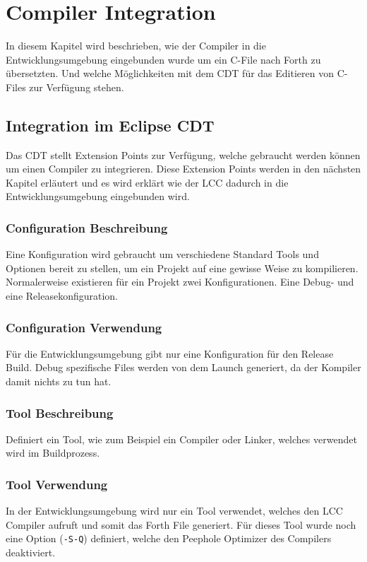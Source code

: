\chapter{Compiler Integration}
\label{chap:compilerintegration}

In diesem Kapitel wird beschrieben, wie der Compiler in die Entwicklungsumgebung eingebunden wurde um ein C-File nach Forth zu übersetzten. Und welche Möglichkeiten mit dem CDT für das Editieren von C-Files zur Verfügung stehen.

\section{Integration im Eclipse CDT}

Das CDT stellt Extension Points zur Verfügung, welche gebraucht werden können um einen Compiler zu integrieren. Diese Extension Points werden in den nächsten Kapitel erläutert und es wird erklärt wie der LCC dadurch in die Entwicklungsumgebung eingebunden wird.

\subsection{Configuration Beschreibung}
Eine Konfiguration wird gebraucht um verschiedene Standard Tools und Optionen bereit zu stellen, um ein Projekt auf eine gewisse Weise zu kompilieren. Normalerweise existieren für ein Projekt zwei Konfigurationen. Eine Debug- und eine Releasekonfiguration.

\subsection{Configuration Verwendung}
Für die Entwicklungsumgebung gibt nur eine Konfiguration für den Release Build. Debug spezifische Files werden von dem Launch generiert, da der Kompiler damit nichts zu tun hat.

\subsection{Tool Beschreibung}
Definiert ein Tool, wie zum Beispiel ein Compiler oder Linker, welches verwendet wird im Buildprozess.

\subsection{Tool Verwendung}
In der Entwicklungsumgebung wird nur ein Tool verwendet, welches den LCC Compiler aufruft und somit das Forth File generiert. Für dieses Tool wurde noch eine Option (\verb!-S-Q!) definiert, welche den Peephole Optimizer des Compilers deaktiviert.

